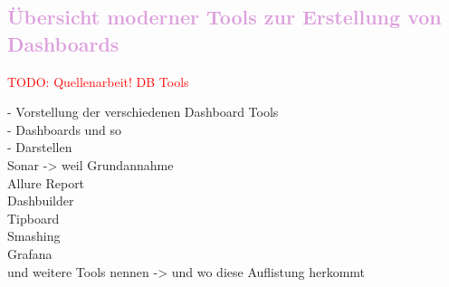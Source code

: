\subsection{\textcolor{Plum}{Übersicht moderner Tools zur Erstellung von Dash\-boards}}
\label{ch:SdF:Legacy:sec:Dashboardtools}


\textcolor{red}{TODO: Quellenarbeit! DB Tools}

\noindent
- Vorstellung der verschiedenen Dashboard Tools\\
- Dashboards und so\\
- Darstellen\\

\noindent
Sonar -> weil Grundannahme\\

\noindent
Allure Report\\
Dashbuilder\\
Tipboard\\
Smashing\\
Grafana\\
und weitere Tools nennen -> und wo diese Auflistung herkommt
